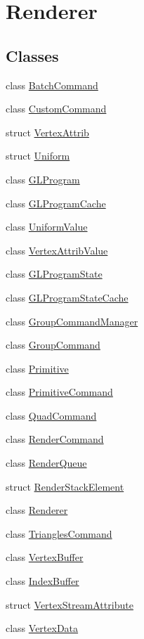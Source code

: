 \hypertarget{group__renderer}{}\section{Renderer}
\label{group__renderer}
\subsection*{Classes}
\begin{DoxyCompactItemize}
\item 
class \hyperlink{classBatchCommand}{Batch\+Command}
\item 
class \hyperlink{classCustomCommand}{Custom\+Command}
\item 
struct \hyperlink{structVertexAttrib}{Vertex\+Attrib}
\item 
struct \hyperlink{structUniform}{Uniform}
\item 
class \hyperlink{classGLProgram}{G\+L\+Program}
\item 
class \hyperlink{classGLProgramCache}{G\+L\+Program\+Cache}
\item 
class \hyperlink{classUniformValue}{Uniform\+Value}
\item 
class \hyperlink{classVertexAttribValue}{Vertex\+Attrib\+Value}
\item 
class \hyperlink{classGLProgramState}{G\+L\+Program\+State}
\item 
class \hyperlink{classGLProgramStateCache}{G\+L\+Program\+State\+Cache}
\item 
class \hyperlink{classGroupCommandManager}{Group\+Command\+Manager}
\item 
class \hyperlink{classGroupCommand}{Group\+Command}
\item 
class \hyperlink{classPrimitive}{Primitive}
\item 
class \hyperlink{classPrimitiveCommand}{Primitive\+Command}
\item 
class \hyperlink{classQuadCommand}{Quad\+Command}
\item 
class \hyperlink{classRenderCommand}{Render\+Command}
\item 
class \hyperlink{classRenderQueue}{Render\+Queue}
\item 
struct \hyperlink{structRenderStackElement}{Render\+Stack\+Element}
\item 
class \hyperlink{classRenderer}{Renderer}
\item 
class \hyperlink{classTrianglesCommand}{Triangles\+Command}
\item 
class \hyperlink{classVertexBuffer}{Vertex\+Buffer}
\item 
class \hyperlink{classIndexBuffer}{Index\+Buffer}
\item 
struct \hyperlink{structVertexStreamAttribute}{Vertex\+Stream\+Attribute}
\item 
class \hyperlink{classVertexData}{Vertex\+Data}
\end{DoxyCompactItemize}
